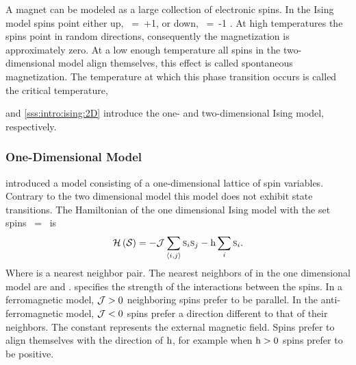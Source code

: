 A magnet can be modeled as a large collection of electronic spins. In the Ising model spins point either up, \mbox{\spin{} = +1}, or down, \mbox{\spin{} = -1} \cite{strogatz2014nonlinear}. At high temperatures the spins point in random directions, consequently the magnetization is approximately zero. At a low enough temperature all spins in the two-dimensional model align themselves, this effect is called spontaneous magnetization. The temperature at which this phase transition occurs is called the critical temperature, \criticalTemperature \cite{cai20011Handout}

 and \ref{sss:intro:ising:2D} introduce the one- and two-dimensional Ising model, respectively. 

\subsubsection{One-Dimensional Model}
	\label{sss:intro:ising:1D}
	\textcite{ising1925beitrag} introduced a model consisting of a one-dimensional lattice of spin variables. Contrary to the two dimensional model this model does not exhibit state transitions. The Hamiltonian of the one dimensional Ising model with the set spins \mbox{\configuration{} = \spinset} is
	\begin{equation}\label{eq:intro:ising:1D:hamiltonian}
		\mathcal{H}\left(\mathcal{S}_{} \right) = - \mathcal{J} \sum_{\left\langle i, j\right\rangle}\textsc{s}_{i}\textsc{s}_{j} - \mathrm{h} \sum_{i} \textsc{s}_{i}.
	\end{equation}
	Where  is a nearest neighbor pair. The nearest neighbors of  in the one dimensional model are  and . \interactionStrength specifies the strength of the interactions between the spins. In a ferromagnetic model, \mbox{$\mathcal{J} > 0$} neighboring spins prefer to be parallel. In the anti-ferromagnetic model, \mbox{$\mathcal{J} < 0$} spins prefer a direction different to that of their neighbors. The constant \magneticMoment represents the external magnetic field. Spins prefer to align themselves with the direction of $\mathrm{h}$, for example when \mbox{$\mathrm{h} > 0$} spins prefer to be positive. 

